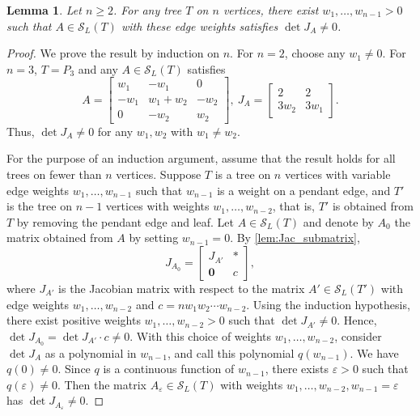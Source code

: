 \documentclass{article}
\newtheorem{lemma}[theorem]{Lemma}
\theoremstyle{definition}
\newcommand{\mptn}{\mathcal{S}}
\begin{document}
\begin{lemma}
\label{lem:jac_tree}
Let $n \geq 2$. For any tree $T$ on $n$ vertices, there exist $w_1, \dots, w_{n-1} > 0 $ such that $A \in \mptn_L(T)$ with these edge weights satisfies $\det J_A \neq 0$.
\end{lemma}

\begin{proof}
We prove the result by induction on $n$.  For $n =2$, choose any $w_1 \neq 0$. For $n=3$, $T= P_3$ and any $A \in \mptn_L(T)$ satisfies
\[
A = \begin{bmatrix}
    w_1  & -w_1 & 0 \\
    -w_1 & w_1 + w_2 & -w_2\\
    0 & -w_2 & w_2
\end{bmatrix}, \ 
J_A = \begin{bmatrix}
2 & 2 \\
3w_2 & 3w_1 
\end{bmatrix}.
\]
Thus, $\det J_A \neq 0$ for any $w_1, w_2$ with $w_1 \neq w_2$.

For the purpose of an induction argument, assume that the result holds for all trees on fewer than $n$ vertices. Suppose $T$ is a  tree on $n$ vertices with variable edge weights $w_1, \dots, w_{n-1}$ such that $w_{n-1}$ is a weight on a pendant edge, and  $T'$ is the tree on $n-1$ vertices   with weights $w_1, \dots, w_{n-2}$, that is, $T'$ is obtained from $T$ by removing the pendant edge and leaf. Let $A \in \mptn_L(T)$ and denote by $A_0$ the matrix obtained from $A$ by setting $w_{n-1} = 0$. By \cref{lem:Jac_submatrix}, 
\[
J_{A_0}  =  \left[\begin{array}{c|c}
J_{A'} & \ast \\ \hline
\mathbf{0} & c
\end{array}
\right],
\]
where $J_{A'}$ is the Jacobian matrix with respect to the matrix $A' \in \mptn_L(T')$ with edge weights $w_1, \dots, w_{n-2}$ and $c =  nw_1 w_2  \cdots w_{n-2}$. Using the induction hypothesis, there exist positive weights $w_1, \dots, w_{n-2} > 0$ such that $\det J_{A'}\neq 0$. Hence, $\det J_{A_0} = \det J_{A'} \cdot c \neq 0$. With this choice of weights $w_1, \dots, w_{n-2}$, consider $\det J_A$ as a polynomial in $w_{n-1}$, and call this polynomial $q(w_{n-1})$. We have $q(0) \neq 0$. Since $q$ is a continuous function of $w_{n-1}$, there exists $\varepsilon > 0$ such that $q(\varepsilon) \neq 0$. Then the matrix $A_\varepsilon \in \mptn_L(T)$ with weights $w_1, \dots, w_{n-2}, w_{n-1} = \varepsilon$ has $\det J_{A_\varepsilon} \neq 0$.
\end{proof}
\end{document}

